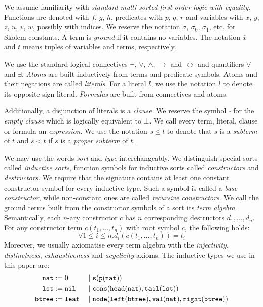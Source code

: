 
We assume familiarity with \textit{standard multi-sorted first-order logic with equality}. Functions are denoted with $f$, $g$, $h$, predicates with $p$, $q$, $r$ and variables with $x$, $y$, $z$, $u$, $v$, $w$, possibly with indices. We reserve the notation $\sigma$, $\sigma_0$, $\sigma_1$, etc. for Skolem constants. A term is \textit{ground} if it contains no variables. The notation $\overline{x}$ and $\overline{t}$ means tuples of variables and terms, respectively.

We use the standard logical connectives $\neg$, $\lor$, $\land$, $\rightarrow$ and $\leftrightarrow$ and quantifiers $\forall$ and $\exists$. \textit{Atoms} are built inductively from terms and predicate symbols. Atoms and their negations are called \textit{literals}. For a literal $l$, we use the notation $\overline{l}$ to denote its opposite sign literal. \textit{Formulas} are built from connectives and atoms.

Additionally, a disjunction of literals is a \textit{clause}. We reserve the symbol $\square$ for the \textit{empty clause} which is logically equivalent to $\bot$. We call every term, literal, clause or formula an \textit{expression}. We use the notation $s\trianglelefteq t$ to denote that $s$ is a \textit{subterm} of $t$ and $s\triangleleft t$ if $s$ is a \textit{proper subterm} of $t$.

We may use the words \textit{sort} and \textit{type} interchangeably. We distinguish special sorts called \textit{inductive sorts}, function symbols for inductive sorts called \textit{constructors} and \textit{destructors}. We require that the signature contains at least one constant constructor symbol for every inductive type. Such a symbol is called a \textit{base constructor}, while non-constant ones are called \textit{recursive constructors}. We call the ground terms built from the constructor symbols of a sort its \textit{term algebra}. Semantically, each $n$-ary constructor $c$ has $n$ corresponding destructors $d_1,...,d_n$. For any constructor term $c(t_1,...,t_n)$ with root symbol $c$, the following holds:
$$\forall 1\le i\le n. d_i(c(t_1,...,t_n))=t_i$$
Moreover, we usually axiomatise every term algebra with the \textit{injectivity}, \textit{distinctness}, \textit{exhaustiveness} and \textit{acyclicity} axioms. The inductive types we use in this paper are:
$$\begin{aligned}\mathtt{nat}&:=0 &&\mid \mathtt{s}(\mathtt{p}(\mathtt{nat}))\\
\mathtt{lst}&:=\mathtt{nil}&&\mid\mathtt{cons}(\mathtt{head}(\mathtt{nat}),\mathtt{tail}(\mathtt{lst}))\\
\mathtt{btree}&:=\mathtt{leaf} &&\mid \mathtt{node}(\mathtt{left}(\mathtt{btree}),\mathtt{val}(\mathtt{nat}),\mathtt{right}(\mathtt{btree}))\end{aligned}$$

